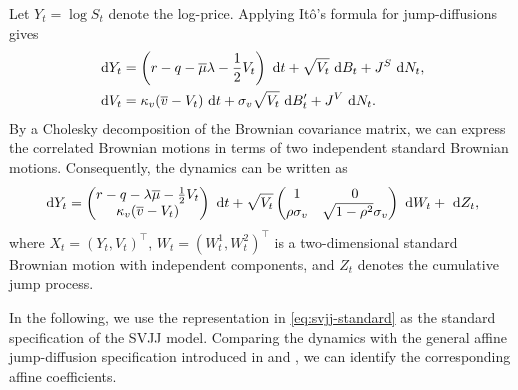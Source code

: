 \begin{remark}
  Let $Y_t=\log S_t$ denote the log-price. Applying Itô's formula for jump-diffusions gives
  \begin{align}
    \text{ d} Y_t
    &=\left(r-q-\overline{\mu}\lambda-\frac{1}{2}V_t\right)\text{ d} t
      +\sqrt{V_t}\text{ d} B_t+J^S\text{ d} N_t, \nonumber\\
    \text{ d} V_t
    &=\kappa_v(\overline{v}-V_t)\text{ d} t
      +\sigma_v\sqrt{V_t}\text{ d} B_t'+J^V\text{ d} N_t.
    \label{eq:svjj-log}
  \end{align}
  By a Cholesky decomposition of the Brownian covariance matrix, we can express the correlated
  Brownian motions in terms of two independent standard Brownian motions. Consequently, the
  dynamics can be written as
  \begin{equation}
    \text{ d} Y_t
    =
    \begin{pmatrix}
      r-q-\lambda\overline{\mu}-\frac{1}{2}V_t\\
      \kappa_v(\overline{v}-V_t)
    \end{pmatrix}\text{ d} t
    +
    \sqrt{V_t}
    \begin{pmatrix}
      1&0\\
      \rho\sigma_v&\sqrt{1-\rho^2}\sigma_v
    \end{pmatrix}\text{ d} W_t
    +\text{ d} Z_t,
    \label{eq:svjj-standard}
  \end{equation}
  where $X_t=(Y_t,V_t)^\top$, $W_t=(W_t^1,W_t^2)^\top$ is a two-dimensional standard
  Brownian motion with independent components, and $Z_t$ denotes the cumulative jump process.
\end{remark}
In the following, we use the representation in \eqref{eq:svjj-standard} as the standard
specification of the SVJJ model. Comparing the dynamics with the general affine jump-diffusion
specification introduced in  and \parencite{Duffie2000}, we can identify the
corresponding affine coefficients.

